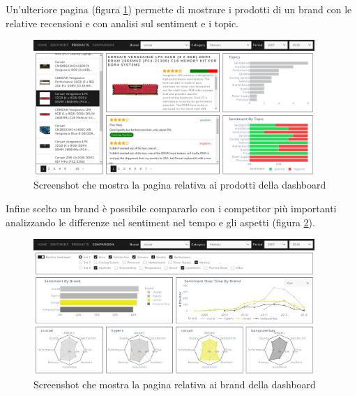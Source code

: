 \newpage

Un'ulteriore pagina (figura \ref{fig:dashboard3}) permette di mostrare i prodotti di un brand con le relative recensioni e con analisi sul sentiment e i topic.

\begin{figure}[ht]
  \centering
  \includegraphics[width=0.95\textwidth]{images/dashboard/dashboard_products.png}
  \caption{Screenshot che mostra la pagina relativa ai prodotti della dashboard}
  \label{fig:dashboard3}
\end{figure}

Infine scelto un brand è possibile compararlo con i competitor più importanti analizzando le differenze nel sentiment nel tempo e gli aspetti (figura \ref{fig:dashboard4}).

\begin{figure}[ht]
  \centering
  \includegraphics[width=0.95\textwidth]{images/dashboard/dashboard_comparison.png}
  \caption{Screenshot che mostra la pagina relativa ai brand della dashboard}
  \label{fig:dashboard4}
\end{figure}